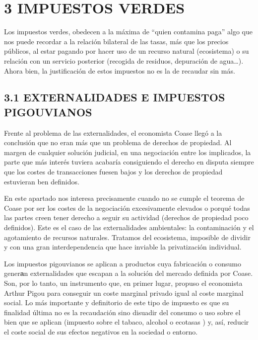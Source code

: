 \documentclass[
]{article}
\begin{document}
\hypertarget{impuestos-verdes}{%
\section*{3 IMPUESTOS VERDES}\label{impuestos-verdes}}

Los impuestos verdes, obedecen a la máxima de ``quien contamina paga''
algo que nos puede recordar a la relación bilateral de las tasas, más
que los precios públicos, al estar pagando por hacer uso de un recurso
natural (ecosistema) o su relación con un servicio posterior (recogida
de residuos, depuración de agua\ldots). Ahora bien, la justificación de
estos impuestos no es la de recaudar sin más.

\hypertarget{externalidades-e-impuestos-pigouvianos}{%
\subsection{3.1 EXTERNALIDADES E IMPUESTOS
PIGOUVIANOS}\label{externalidades-e-impuestos-pigouvianos}}

Frente al problema de las externalidades, el economista Coase llegó a la
conclusión que no eran más que un problema de derechos de propiedad. Al
margen de cualquier solución judicial, en una negociación entre los
implicados, la parte que más interés tuviera acabaría consiguiendo el
derecho en disputa siempre que los costes de transacciones fuesen bajos
y los derechos de propiedad estuvieran ben definidos.

En este apartado nos interesa precisamente cuando no se cumple el
teorema de Coase por ser los costes de la negociación excesivamente
elevados o porqué todas las partes creen tener derecho a seguir su
actividad (derechos de propiedad poco definidos). Este es el caso de las
externalidades ambientales: la contaminación y el agotamiento de
recursos naturales. Tratamos del ecosistema, imposible de dividir y con
una gran interdependencia que hace inviable la privatización individual.

Los impuestos pigouvianos se aplican a productos cuya fabricación o
consumo gener\textbf{a}n externalidades que escapan a la solución del
mercado definida por Coase. Son, por lo tanto, un instrumento que, en
primer lugar, propuso el economista Arthur Pigou para conseguir un coste
marginal privado igual al coste marginal social. Lo más importante y
definitorio de este tipo de impuesto es que su finalidad última no es la
recaudación sino disuadir del consumo o uso sobre el bien que se aplican
(impuesto sobre el tabaco, alcohol o ecotasas ) y, así, reducir el coste
social de sus efectos negativos en la sociedad o entorno.
\end{document}
